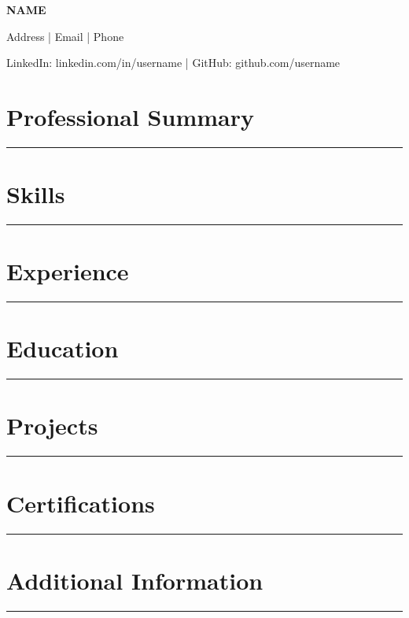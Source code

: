 \documentclass[a4paper,10pt]{article}
\newcommand{\sectionline}[1]{
    \vspace{4pt}
    \section*{#1}
    \vspace{-10pt}
    \hrule
    \vspace{6pt}
}
\begin{document}
\begin{center}
{\LARGE\textbf{NAME}}

Address | Email | Phone

LinkedIn: linkedin.com/in/username |
GitHub: github.com/username
\end{center}

\sectionline{Professional Summary}


\sectionline{Skills}


\sectionline{Experience}


\sectionline{Education}


\sectionline{Projects}


\sectionline{Certifications}


\sectionline{Additional Information}

\end{document}
